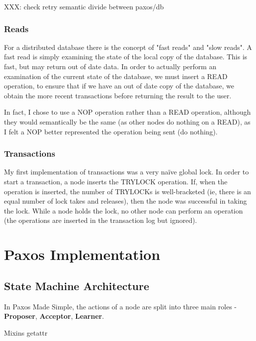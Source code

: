 \documentclass[12pt,twoside,notitlepage]{report}
\begin{document}
XXX: check retry semantic divide between paxos/db


\subsubsection{Reads}

For a distributed database there is the concept of "fast reads" and "slow reads". A fast read is
simply examining the state of the local copy of the database. This is fast, but may return out of
date data. In order to actually perform an examination of the current state of the database, we
must insert a READ operation, to ensure that if we have an out of date copy of the database, we
obtain the more recent transactions before returning the result to the user.

In fact, I chose to use a NOP operation rather than a READ operation, although they would
semantically be the same (as other nodes do nothing on a READ), as I felt a NOP better represented
the operation being sent (do nothing).

\subsubsection{Transactions}

My first implementation of transactions was a very na\"ive global lock. In order to start a
transaction, a node inserts the TRYLOCK operation. If, when the operation is inserted, the number
of TRYLOCKs is well-bracketed (ie, there is an equal number of lock takes and releases), then the
node was successful in taking the lock. While a node holds the lock, no other node can perform an
operation (the operations are inserted in the transaction log but ignored).

\section{Paxos Implementation}

\subsection{State Machine Architecture}

In Paxos Made Simple, the actions of a node are split into three main roles - {\bf Proposer},
{\bf Acceptor}, {\bf Learner}.

Mixins
getattr
\end{document}
